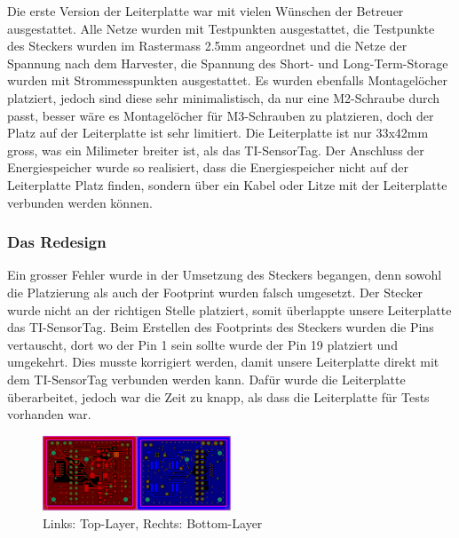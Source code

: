 Die erste Version der Leiterplatte war mit vielen Wünschen der Betreuer ausgestattet. Alle Netze wurden mit Testpunkten ausgestattet, die Testpunkte des Steckers wurden im Rastermass 2.5mm angeordnet und die Netze der Spannung nach dem Harvester, die Spannung des Short- und Long-Term-Storage wurden mit Strommesspunkten ausgestattet. Es wurden ebenfalls Montagelöcher platziert, jedoch sind diese sehr minimalistisch, da nur eine M2-Schraube durch passt, besser wäre es Montagelöcher für M3-Schrauben zu platzieren, doch der Platz auf der Leiterplatte ist sehr limitiert. Die Leiterplatte ist nur 33x42mm gross, was ein Milimeter breiter ist, als das TI-SensorTag. Der Anschluss der Energiespeicher wurde so realisiert, dass die Energiespeicher nicht auf der Leiterplatte Platz finden, sondern über ein Kabel oder Litze mit der Leiterplatte verbunden werden können.

\subsubsection{Das Redesign}

Ein grosser Fehler wurde in der Umsetzung des Steckers begangen, denn sowohl die Platzierung als auch der Footprint wurden falsch umgesetzt. Der Stecker wurde nicht an der richtigen Stelle platziert, somit überlappte unsere Leiterplatte das TI-SensorTag. Beim Erstellen des Footprints des Steckers wurden die Pins vertauscht, dort wo der Pin 1 sein sollte wurde der Pin 19 platziert und umgekehrt. Dies musste korrigiert werden, damit unsere Leiterplatte direkt mit dem TI-SensorTag verbunden werden kann. Dafür wurde die Leiterplatte überarbeitet, jedoch war die Zeit zu knapp, als dass die Leiterplatte für Tests vorhanden war.

\begin{figure}[ht]
    \includegraphics[width=0.5\textwidth]{3Vorgehen/imag/Layout_Redesign.png}
    \caption{Links: Top-Layer, Rechts: Bottom-Layer}\label{layout_redesign} 
\end{figure}



